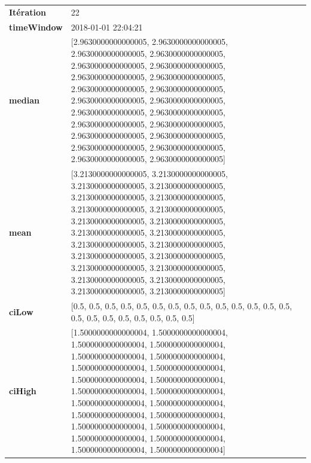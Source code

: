 \begin{table}[H]
	\centering
	\begin{tabularx}{\textwidth}{lX}
		\textbf{Itération}& 22 \\
		\textbf{timeWindow} &2018-01-01 22:04:21 \\ 
		\textbf{median}& [2.9630000000000005, 2.9630000000000005, 2.9630000000000005, 2.9630000000000005, 2.9630000000000005, 2.9630000000000005, 2.9630000000000005, 2.9630000000000005, 2.9630000000000005, 2.9630000000000005, 2.9630000000000005, 2.9630000000000005, 2.9630000000000005, 2.9630000000000005, 2.9630000000000005, 2.9630000000000005, 2.9630000000000005, 2.9630000000000005, 2.9630000000000005, 2.9630000000000005, 2.9630000000000005, 2.9630000000000005] \\
		\textbf{mean} & [3.2130000000000005, 3.2130000000000005, 3.2130000000000005, 3.2130000000000005, 3.2130000000000005, 3.2130000000000005, 3.2130000000000005, 3.2130000000000005, 3.2130000000000005, 3.2130000000000005, 3.2130000000000005, 3.2130000000000005, 3.2130000000000005, 3.2130000000000005, 3.2130000000000005, 3.2130000000000005, 3.2130000000000005, 3.2130000000000005, 3.2130000000000005, 3.2130000000000005, 3.2130000000000005, 3.2130000000000005] \\
		\textbf{ciLow}& [0.5, 0.5, 0.5, 0.5, 0.5, 0.5, 0.5, 0.5, 0.5, 0.5, 0.5, 0.5, 0.5, 0.5, 0.5, 0.5, 0.5, 0.5, 0.5, 0.5, 0.5, 0.5] \\
		\textbf{ciHigh}& [1.5000000000000004, 1.5000000000000004, 1.5000000000000004, 1.5000000000000004, 1.5000000000000004, 1.5000000000000004, 1.5000000000000004, 1.5000000000000004, 1.5000000000000004, 1.5000000000000004, 1.5000000000000004, 1.5000000000000004, 1.5000000000000004, 1.5000000000000004, 1.5000000000000004, 1.5000000000000004, 1.5000000000000004, 1.5000000000000004, 1.5000000000000004, 1.5000000000000004, 1.5000000000000004, 1.5000000000000004] \\
		
			\end{tabularx} 
		\end{table}
		

